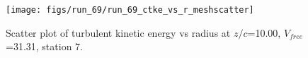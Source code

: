 \begin{figure}[H]
\centering
\texttt{[image: figs/run\_69/run\_69\_ctke\_vs\_r\_meshscatter]}
\caption{Scatter plot of turbulent kinetic energy vs radius at $z/c$=10.00, $V_{free}$=31.31, station 7.}
\end{figure}


